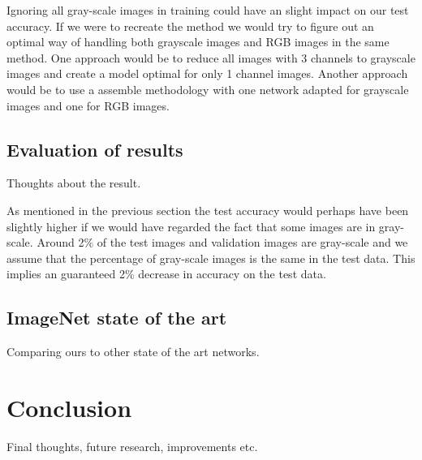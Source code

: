 \documentclass{kthreport}
\begin{document}
Ignoring all gray-scale images in training could have an slight impact on our test accuracy. If we were to recreate the method we would try to figure out an optimal way of handling both grayscale images and RGB images in the same method. One approach would be to reduce all images with 3 channels to grayscale images and create a model optimal for only 1 channel images. Another approach would be to use a assemble methodology with one network adapted for grayscale images and one for RGB images.

\subsection{Evaluation of results}

Thoughts about the result.

As mentioned in the previous section the test accuracy would perhaps have been slightly higher if we would have regarded the fact that some images are in gray-scale. Around 2\% of the test images and validation images are gray-scale and we assume that the percentage of gray-scale images is the same in the test data. This implies an guaranteed 2\% decrease in accuracy on the test data.

\subsection{ImageNet state of the art}

Comparing ours to other state of the art networks.

\section{Conclusion}
Final thoughts, future research, improvements etc.

{}

\end{document}
